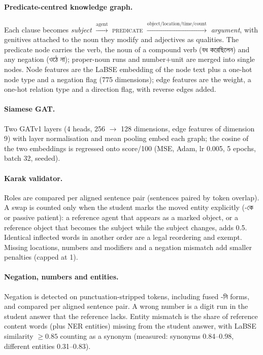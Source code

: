 \documentclass[10pt,a4paper,twocolumn]{article}
\newcommand{\bn}[1]{{\bengalifont #1}}
\begin{document}
\paragraph{Predicate-centred knowledge graph.}
Each clause becomes \emph{subject} $\xrightarrow{\text{agent}}$
\textsc{predicate} $\xrightarrow{\text{object/location/time/count}}$
\emph{argument}, with genitives attached to the noun they modify and
adjectives as qualities. The predicate node carries the verb, the noun of a
compound verb (\bn{বধ করেছিলেন}) and any negation (\bn{ওঠে না}); proper-noun
runs and number+unit are merged into single nodes. Node features are the
LaBSE embedding of the node text plus a one-hot node type and a negation flag
(775 dimensions); edge features are the weight, a one-hot relation type and a
direction flag, with reverse edges added.

\paragraph{Siamese GAT.}
Two GATv1 layers (4 heads, 256 $\rightarrow$ 128 dimensions, edge features of
dimension 9) with layer normalisation and mean pooling embed each graph; the
cosine of the two embeddings is regressed onto score/100 (MSE, Adam, lr
0.005, 5 epochs, batch 32, seeded).

\paragraph{Karak validator.}
Roles are compared per aligned sentence pair (sentences paired by token
overlap). A swap is counted only when the student marks the moved entity
explicitly (\bn{-কে} or passive patient): a reference agent that appears as a
marked object, or a reference object that becomes the subject while the
subject changes, adds 0.5. Identical inflected words in another order are a
legal reordering and exempt. Missing locations, numbers and modifiers and a
negation mismatch add smaller penalties (capped at 1).

\paragraph{Negation, numbers and entities.}
Negation is detected on punctuation-stripped tokens, including fused
\bn{-নি} forms, and compared per aligned sentence pair. A wrong number is a
digit run in the student answer that the reference lacks. Entity mismatch is
the share of reference content words (plus NER entities) missing from the
student answer, with LaBSE similarity $\geq 0.85$ counting as a synonym
(measured: synonyms 0.84--0.98, different entities 0.31--0.83).
\end{document}
